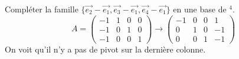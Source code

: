 \begin{exemple}
    Compléter la famille $\{\vec{e_2} -\vec{e_1}, \vec{e_3} -\vec{e_1}, \vec{e_4} - \vec{e_1}\}$ en une base de \R$^4$.
    \[A = \begin{pmatrix}
        -1 & 1 & 0 & 0 \\
        -1&0&1 & 0\\
        -1&0&0 & 1
    \end{pmatrix}\to \begin{pmatrix}
        -1 & 0 & 0 & 1 \\
        0&1&0 & -1\\
        0&0&1 & -1
    \end{pmatrix} \]
    On voit qu'il n'y a pas de pivot sur la dernière colonne.
\end{exemple}



